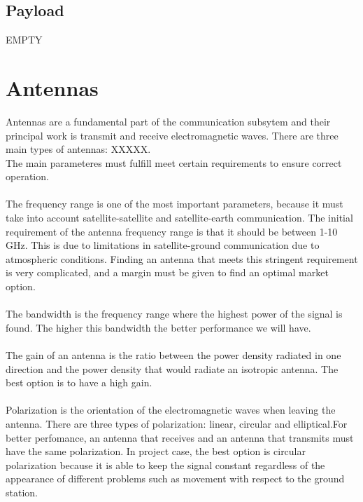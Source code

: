 \subsection{Payload}

EMPTY

\section{Antennas}
 
Antennas are a fundamental part of the communication subsytem and their principal work is transmit and receive electromagnetic waves.
There are three main types of antennas: XXXXX. \\
The main parameteres must fulfill meet certain requirements to ensure correct operation.

\paragraph{}
The frequency range is one of the most important parameters, because it must take into account satellite-satellite and satellite-earth communication. The initial requirement of the antenna frequency range is that it should be between 1-10 GHz. This is due to limitations in satellite-ground communication due to atmospheric conditions. Finding an antenna that meets this stringent requirement is very complicated, and a margin must be given to find an optimal market option.

\paragraph{}
The bandwidth is the frequency range where the highest power of the signal is found. The higher this bandwidth the better performance we will have.

\paragraph{}
The gain of an antenna is the ratio between the power density radiated in one direction and the power density that would radiate an isotropic antenna. The best option is to have a high gain. 

\paragraph{}
Polarization is the orientation of the electromagnetic waves when leaving the antenna. There are three types of polarization: linear, circular and elliptical.For better perfomance, an antenna that receives and an antenna that transmits must have the same polarization. In project case, the best option is circular polarization because it is able to keep the signal constant regardless of the appearance of different problems such as movement with respect to the ground station.

